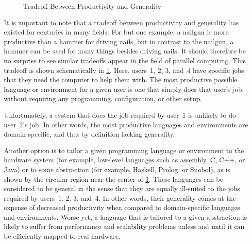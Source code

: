 \begin{figure}
\centering
{}
\caption{Tradeoff Between Productivity and Generality}
\label{fig:intro:Tradeoff Between Productivity and Generality}
\end{figure}

It is important to note that a tradeoff between productivity and
generality has existed for centuries in many fields.
For but one example, a nailgun is more productive than a hammer for
driving nails, but in contrast to the nailgun, a hammer can be used for
many things besides driving nails.
It should therefore be no surprise to see similar tradeoffs
appear in the field of parallel computing.
This tradeoff is shown schematically in
\cref{fig:intro:Tradeoff Between Productivity and Generality}.
Here, users~1, 2, 3, and~4 have specific jobs that they need the computer
to help them with.
The most productive possible language or environment for a given user is one
that simply does that user's job, without requiring any programming,
configuration, or other setup.

\QuickQuizEnd

Unfortunately, a system that does the job required by user~1 is
unlikely to do user~2's job.
In other words, the most productive languages and environments are
domain-specific, and thus by definition lacking generality.

Another option is to tailor a given programming language or environment
to the hardware system (for example, low-level languages such as
assembly, C, C++, or Java) or to some abstraction (for example,
Haskell, Prolog, or Snobol), as is shown by the circular region near
the center of
\cref{fig:intro:Tradeoff Between Productivity and Generality}.
These languages can be considered to be general in the sense that they
are equally ill-suited to the jobs required by users~1, 2, 3, and~4.
In other words, their generality comes at the expense of
decreased productivity when compared to domain-specific languages
and environments.
Worse yet, a language that is tailored to a given abstraction
is likely to suffer from performance and scalability problems
unless and until it can be efficiently mapped to real hardware.

